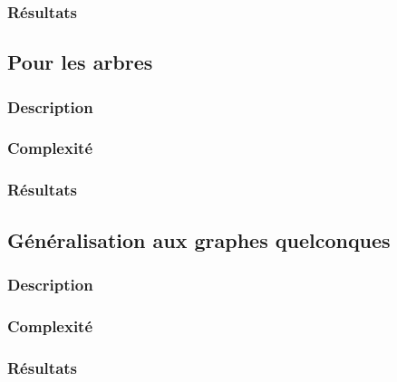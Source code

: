 \documentclass[a4paper,10pt]{article}
\begin{document}

\subsubsection{Résultats}


\subsection{Pour les arbres}

\subsubsection{Description}

\subsubsection{Complexité}

\subsubsection{Résultats}


\subsection{Généralisation aux graphes quelconques}


\subsubsection{Description}

\subsubsection{Complexité}

\subsubsection{Résultats}
\end{document}
